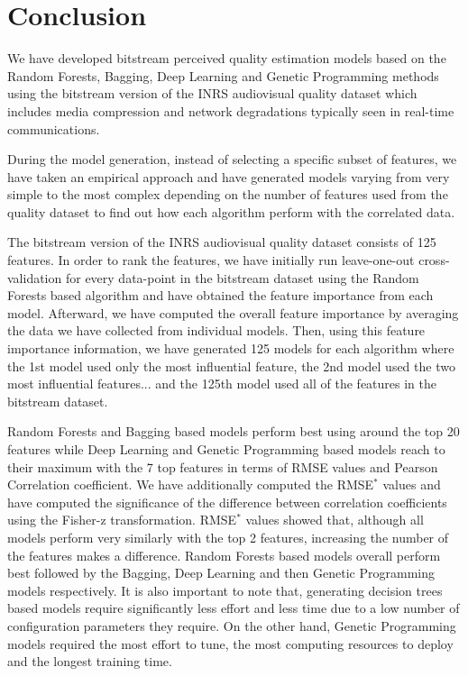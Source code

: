 \documentclass[journal]{IEEEtran}
\begin{document}
\vspace{-0.3cm}

\section{Conclusion}
\label{sec:conclusion}

We have developed bitstream perceived quality estimation models based on the Random Forests, Bagging, Deep Learning and Genetic Programming methods using the bitstream version of the INRS audiovisual quality dataset which includes media compression and network degradations typically seen in real-time communications.

During the model generation, instead of selecting a specific subset of features, we have taken an empirical approach and have generated models varying from very simple to the most complex depending on the number of features used from the quality dataset to find out how each algorithm perform with the correlated data. 

The bitstream version of the INRS audiovisual quality dataset consists of 125 features. In order to rank the features, we have initially run leave-one-out cross-validation for every data-point in the bitstream dataset using the Random Forests based algorithm and have obtained the feature importance from each model. Afterward, we have computed the overall feature importance by averaging the data we have collected from individual models. Then, using this feature importance information, we have generated 125 models for each algorithm where the 1st model used only the most influential feature, the 2nd model used the two most influential features... and the 125th model used all of the features in the bitstream dataset.

Random Forests and Bagging based models perform best using around the top 20 features while Deep Learning and Genetic Programming based models reach to their maximum with the 7 top features in terms of RMSE values and Pearson Correlation coefficient. We have additionally computed the RMSE$^*$ values and have computed the significance of the difference between correlation coefficients using the Fisher-z transformation. RMSE$^*$ values showed that, although all models perform very similarly with the top 2 features, increasing the number of the features makes a difference. Random Forests based models overall perform best followed by the Bagging, Deep Learning and then Genetic Programming models respectively. It is also important to note that, generating decision trees based models require significantly less effort and less time due to a low number of configuration parameters they require. On the other hand, Genetic Programming models required the most effort to tune, the most computing resources to deploy and the longest training time. 
\end{document}
